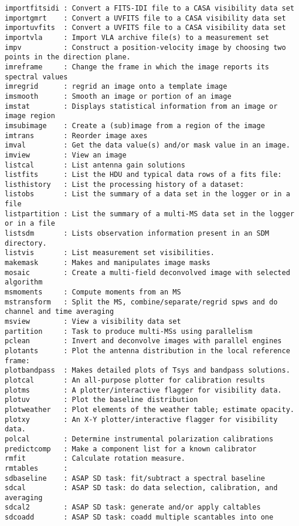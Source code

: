 \begin{verbatim}
importfitsidi : Convert a FITS-IDI file to a CASA visibility data set
importgmrt    : Convert a UVFITS file to a CASA visibility data set
importuvfits  : Convert a UVFITS file to a CASA visibility data set
importvla     : Import VLA archive file(s) to a measurement set
impv          : Construct a position-velocity image by choosing two points in the direction plane.
imreframe     : Change the frame in which the image reports its spectral values
imregrid      : regrid an image onto a template image
imsmooth      : Smooth an image or portion of an image
imstat        : Displays statistical information from an image or image region
imsubimage    : Create a (sub)image from a region of the image
imtrans       : Reorder image axes
imval         : Get the data value(s) and/or mask value in an image.
imview        : View an image
listcal       : List antenna gain solutions
listfits      : List the HDU and typical data rows of a fits file:
listhistory   : List the processing history of a dataset:
listobs       : List the summary of a data set in the logger or in a file
listpartition : List the summary of a multi-MS data set in the logger or in a file
listsdm       : Lists observation information present in an SDM directory.
listvis       : List measurement set visibilities.
makemask      : Makes and manipulates image masks
mosaic        : Create a multi-field deconvolved image with selected algorithm
msmoments     : Compute moments from an MS
mstransform   : Split the MS, combine/separate/regrid spws and do channel and time averaging
msview        : View a visibility data set
partition     : Task to produce multi-MSs using parallelism
pclean        : Invert and deconvolve images with parallel engines
plotants      : Plot the antenna distribution in the local reference frame:
plotbandpass  : Makes detailed plots of Tsys and bandpass solutions.
plotcal       : An all-purpose plotter for calibration results 
plotms        : A plotter/interactive flagger for visibility data.
plotuv        : Plot the baseline distribution
plotweather   : Plot elements of the weather table; estimate opacity.
plotxy        : An X-Y plotter/interactive flagger for visibility data.
polcal        : Determine instrumental polarization calibrations
predictcomp   : Make a component list for a known calibrator
rmfit         : Calculate rotation measure.
rmtables      : 
sdbaseline    : ASAP SD task: fit/subtract a spectral baseline 
sdcal         : ASAP SD task: do data selection, calibration, and averaging
sdcal2        : ASAP SD task: generate and/or apply caltables
sdcoadd       : ASAP SD task: coadd multiple scantables into one

\end{verbatim}
